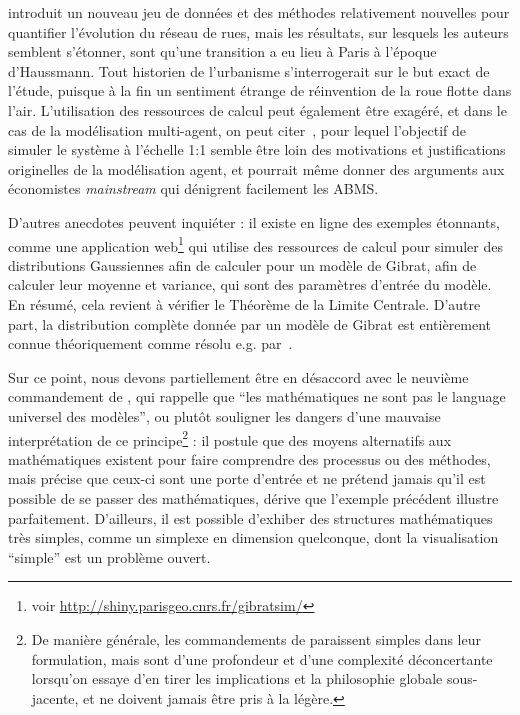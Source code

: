 {\cite{barthelemy2013self} introduit un nouveau jeu de données et des méthodes relativement nouvelles pour quantifier l'évolution du réseau de rues, mais les résultats, sur lesquels les auteurs semblent s'étonner, sont qu'une transition a eu lieu à Paris à l'époque d'Haussmann. Tout historien de l'urbanisme s'interrogerait sur le but exact de l'étude, puisque à la fin un sentiment étrange de réinvention de la roue flotte dans l'air. L'utilisation des ressources de calcul peut également être exagéré, et dans le cas de la modélisation multi-agent, on peut citer~\cite{axtell2016120}, pour lequel l'objectif de simuler le système à l'échelle 1:1 semble être loin des motivations et justifications originelles de la modélisation agent, et pourrait même donner des arguments aux économistes \emph{mainstream} qui dénigrent facilement les ABMS.

D'autres anecdotes peuvent inquiéter :  il existe en ligne des exemples étonnants, comme une application web\footnote{voir \url{http://shiny.parisgeo.cnrs.fr/gibratsim/}} qui utilise des ressources de calcul pour simuler des distributions Gaussiennes afin de calculer pour un modèle de Gibrat, afin de calculer leur moyenne et variance, qui sont des paramètres d'entrée du modèle. En résumé, cela revient à vérifier le Théorème de la Limite Centrale. D'autre part, la distribution complète donnée par un modèle de Gibrat est entièrement connue théoriquement comme résolu e.g. par~\cite{gabaix1999zipf}.

Sur ce point, nous devons partiellement être en désaccord avec le neuvième commandement de , qui rappelle que ``les mathématiques ne sont pas le language universel des modèles'', ou plutôt souligner les dangers d'une mauvaise interprétation de ce principe\footnote{De manière générale, les commandements de  paraissent simples dans leur formulation, mais sont d'une profondeur et d'une complexité déconcertante lorsqu'on essaye d'en tirer les implications et la philosophie globale sous-jacente, et ne doivent jamais être pris à la légère.} : il postule que des moyens alternatifs aux mathématiques existent pour faire comprendre des processus ou des méthodes, mais précise que ceux-ci sont une porte d'entrée et ne prétend jamais qu'il est possible de se passer des mathématiques, dérive que l'exemple précédent illustre parfaitement. D'ailleurs, il est possible d'exhiber des structures mathématiques très simples, comme un simplexe en dimension quelconque, dont la visualisation ``simple'' est un problème ouvert.

}
